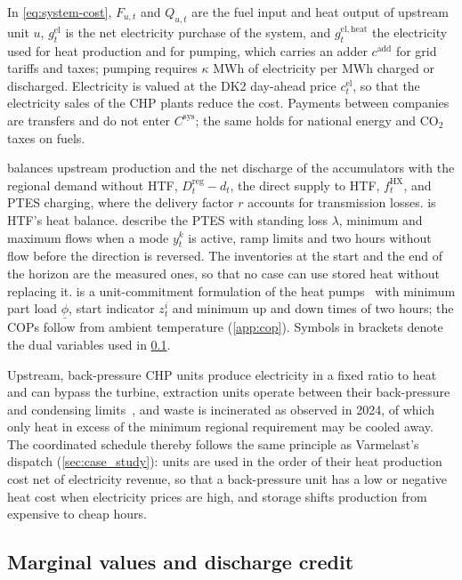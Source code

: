 In \cref{eq:system-cost}, $F_{u,t}$ and $Q_{u,t}$ are the fuel input and heat output of upstream unit $u$, $g^{\mathrm{el}}_t$ is the net electricity purchase of the system, and $g^{\mathrm{el,heat}}_t$ the electricity used for heat production and for pumping, which carries an adder $c^{\mathrm{add}}$ for grid tariffs and taxes; pumping requires $\kappa$ MWh of electricity per MWh charged or discharged. Electricity is valued at the DK2 day-ahead price $c^{\mathrm{el}}_t$, so that the electricity sales of the CHP plants reduce the cost. Payments between companies are transfers and do not enter $C^{\mathrm{sys}}$; the same holds for national energy and CO$_2$ taxes on fuels.

 balances upstream production and the net discharge of the accumulators with the regional demand without HTF, $D^{\mathrm{reg}}_t-d_t$, the direct supply to HTF, $f^{\mathrm{HX}}_t$, and PTES charging, where the delivery factor $r$ accounts for transmission losses.  is HTF's heat balance.  describe the PTES with standing loss $\lambda$, minimum and maximum flows when a mode $y^k_t$ is active, ramp limits and two hours without flow before the direction is reversed. The inventories at the start and the end of the horizon are the measured ones, so that no case can use stored heat without replacing it.  is a unit-commitment formulation of the heat pumps~\cite{taylor2015convex} with minimum part load $\underline\phi$, start indicator $z^i_t$ and minimum up and down times of two hours; the COPs follow from ambient temperature (\cref{app:cop}). Symbols in brackets denote the dual variables used in \cref{sec:derivation}.

Upstream, back-pressure CHP units produce electricity in a fixed ratio to heat and can bypass the turbine, extraction units operate between their back-pressure and condensing limits~\cite{dea2026technologycatalogue,wang2019investigation}, and waste is incinerated as observed in 2024, of which only heat in excess of the minimum regional requirement may be cooled away. The coordinated schedule thereby follows the same principle as Varmelast's dispatch (\cref{sec:case_study}): units are used in the order of their heat production cost net of electricity revenue, so that a back-pressure unit has a low or negative heat cost when electricity prices are high, and storage shifts production from expensive to cheap hours.

\subsection{Marginal values and discharge credit}
\label{sec:derivation}

